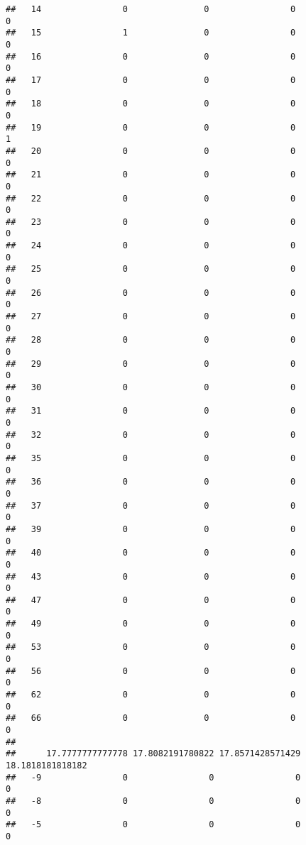 \documentclass[]{article}
\begin{document}
\begin{verbatim}
##   14                0               0                0                0
##   15                1               0                0                0
##   16                0               0                0                0
##   17                0               0                0                0
##   18                0               0                0                0
##   19                0               0                0                1
##   20                0               0                0                0
##   21                0               0                0                0
##   22                0               0                0                0
##   23                0               0                0                0
##   24                0               0                0                0
##   25                0               0                0                0
##   26                0               0                0                0
##   27                0               0                0                0
##   28                0               0                0                0
##   29                0               0                0                0
##   30                0               0                0                0
##   31                0               0                0                0
##   32                0               0                0                0
##   35                0               0                0                0
##   36                0               0                0                0
##   37                0               0                0                0
##   39                0               0                0                0
##   40                0               0                0                0
##   43                0               0                0                0
##   47                0               0                0                0
##   49                0               0                0                0
##   53                0               0                0                0
##   56                0               0                0                0
##   62                0               0                0                0
##   66                0               0                0                0
##     
##      17.7777777777778 17.8082191780822 17.8571428571429 18.1818181818182
##   -9                0                0                0                0
##   -8                0                0                0                0
##   -5                0                0                0                0

\end{verbatim}
\end{document}
